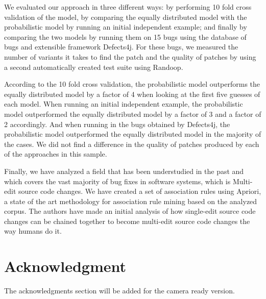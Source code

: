 \documentclass[conference]{IEEEtran}
\begin{document}
We evaluated our approach in three different ways: by performing 10 fold cross 
validation of the model, by comparing the equally distributed model with the probabilistic model by running an initial independent example; and finally by  comparing the two models by running them on 15 bugs using the database of bugs and extensible 
framework Defects4j. For these bugs, we measured the number of variants it takes to find the patch and the quality of patches by using a second automatically created test suite using Randoop. 

According to the 10 fold cross validation, the probabilistic model outperforms the equally distributed model by a factor of 4 when looking at the first five guesses of each model. When running an initial independent example, the probabilistic model outperformed the equally distributed model by a factor of 3 and a factor of 2 accordingly. And when running in the bugs obtained by Defects4j, the probabilistic model outperformed the equally distributed model in the majority of the cases. We did not find a difference in the quality of patches produced by each of the approaches in this sample.

Finally, we have analyzed a field that has been understudied in the past and which covers 
the vast majority of bug fixes in software systems, which is Multi-edit source code changes. 
We have created a set of association rules using Apriori, a state of the art
methodology for association rule mining based on the analyzed corpus. The authors have
made an initial analysis of how single-edit source code changes can be chained together 
to become multi-edit source code changes the way humans do it.





\section*{Acknowledgment}
The acknowledgments section will be added for the camera ready version. 





\end{document}

